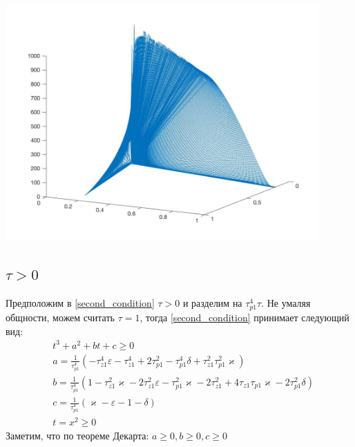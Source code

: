 \documentclass[a4paper]{article}
\begin{document}
\includegraphics[width=12cm]{images/filter2.jpg}

\subsection{$\tau > 0$}
Предположим в \eqref{second_condition} $\tau > 0$ и разделим на $\tau_{p1}^4\tau$. Не умаляя общности, можем считать $\tau = 1$, тогда \eqref{second_condition} принимает следующий вид:
 \begin{equation}
 \begin{aligned}
&t^3 +a^2 +bt + c  \geq 0\\
&a = \frac{1}{\tau_{p1}^4}(- \tau_{z1}^4\varepsilon - \tau_{z1}^4 + 2\tau_{p1}^2- \tau_{p1}^4\delta + \tau_{z1}^2\tau_{p1}^2\varkappa)\\
&b = \frac{1}{\tau_{p1}^4}( 1- \tau_{z1}^2\varkappa - 2\tau_{z1}^2\varepsilon - \tau_{p1}^2\varkappa- 2\tau_{z1}^2+ 4\tau_{z1}\tau_{p1}\varkappa- 2\tau_{p1}^2\delta)\\
&c = \frac{1}{\tau_{p1}^4}(\varkappa-\varepsilon - 1 - \delta)\\
&t = x^2 \geq 0
 \end{aligned}
\end{equation}
Заметим, что по теореме Декарта: $a \geq 0, b \geq 0, c \geq 0$
\end{document}
